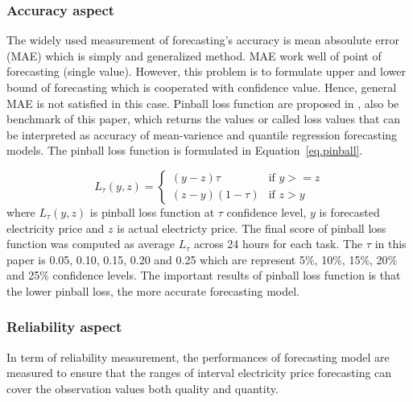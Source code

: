 \documentclass[review]{elsarticle}
\begin{document}
      \subsubsection{Accuracy aspect}
        The widely used measurement of forecasting's accuracy is mean absoulute error (MAE) which is simply and generalized method.
        MAE work well of point of forecasting (single value).
        However, this problem is to formulate upper and lower bound of forecasting which is cooperated with confidence value.
        Hence, general MAE is not satisfied in this case.
        Pinball loss function are proposed in \cite{Maciejowska2016}, also be benchmark of this paper, which returns the values or called loss values that can be interpreted as accuracy of mean-varience and quantile regression forecasting models.
        The pinball loss function is formulated in Equation~\ref{eq.pinball}.

        \begin{equation}
          L_{\tau}(y,z) =
          \begin{cases}
            (y-z)\tau & \text{if  $y>=z$} \\
            (z-y)(1-\tau) & \text{if  $z>y$}
          \end{cases}
          \label{eq.pinball}
        \end{equation}
        where $L_{\tau}(y,z)$ is pinball loss function at $\tau$ confidence level, $y$ is forecasted electricity price and $z$ is actual electricty price.
        The final score of pinball loss function was computed as average $L_{\tau}$ across 24 hours for each task.
        The $\tau$ in this paper is 0.05, 0.10, 0.15, 0.20 and 0.25 which are represent 5$\%$, 10$\%$, 15$\%$, 20$\%$ and 25$\%$ confidence levels.
        The important results of pinball loss function is that the lower pinball loss, the more accurate forecasting model.

      \subsubsection{Reliability aspect}
        In term of reliability measurement, the performances of forecasting model are measured to ensure that the ranges of interval electricity price forecasting can cover the observation values both quality and quantity.
\end{document}
